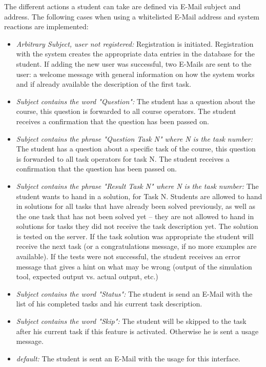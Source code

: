 The different actions a student can take are defined via E-Mail subject and address. The 
following cases when using a whitelisted E-Mail address and system reactions are implemented:
\begin{itemize}
\item \textit{Arbitrary Subject, user not registered:} Registration is initiated. Registration with the 
	system creates the appropriate data entries in the database for the student. If adding the new user was 
	successful, two E-Mails are sent to the user: a welcome message with general information on how the 
	system works and if already available the description of the first task.
\item \textit{Subject contains the word "Question":} The student has a question about the course, this 
	question is forwarded to all course operators. The student receives a confirmation that the 
    question has been passed on.
\item \textit{Subject contains the phrase "Question Task N" where N is the task number:} The student 
    has a question about a specific task of the course, this question is forwarded to all task operators 
	for task N. The student receives a confirmation that the question has been passed on.
\item \textit{Subject contains the phrase "Result Task N" where N is the task number:} The student wants 
    to hand in a solution, for Task N. Students are allowed to hand in solutions for all tasks that 
    have already been solved previously, as well as the one task that has not been solved yet -- they
    are not allowed to hand in solutions for tasks they did not receive the task description yet. The
    solution is tested on the server. If the task solution was appropriate the student will receive the
    next task (or a congratulations message, if no more examples are available). If the tests were not
    successful, the student receives an error message that gives a hint on what may be wrong (output of the
    simulation tool, expected output vs. actual output, etc.)
\item \textit{Subject contains the word "Status":} The student is send an E-Mail with the list of
    his completed tasks and his current task description.
\item \textit{Subject contains the word "Skip":} The student will be skipped to
	the task after his current task if this feature is activated. Otherwise he
	is sent a usage message.
\item \textit{\textit{default:}} The student is sent an E-Mail with the usage for this interface.
\end{itemize}


